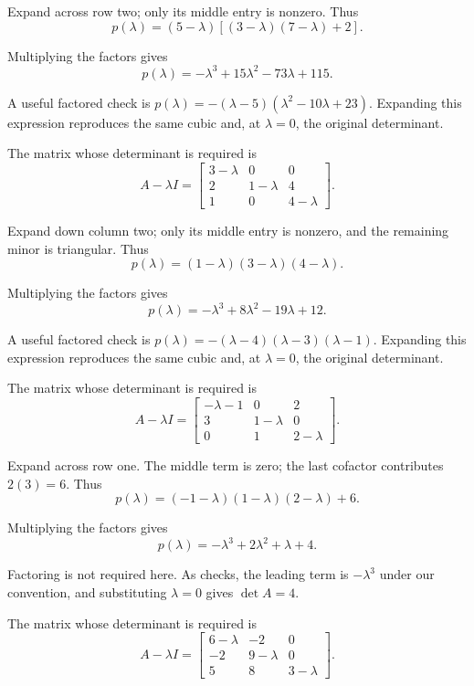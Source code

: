 Expand across row two; only its middle entry is nonzero. Thus
\[ p(\lambda)=(5-\lambda)[(3-\lambda)(7-\lambda)+2].\]

Multiplying the factors gives
\[ \boxed{p(\lambda)=- \lambda^{3} + 15 \lambda^{2} - 73 \lambda + 115}.\]

A useful factored check is $p(\lambda)=- \left(\lambda - 5\right) \left(\lambda^{2} - 10 \lambda + 23\right)$. Expanding this expression reproduces the same cubic and, at $\lambda=0$, the original determinant.

The matrix whose determinant is required is
\[ A-\lambda I=\begin{bmatrix}3 - \lambda & 0 & 0\\2 & 1 - \lambda & 4\\1 & 0 & 4 - \lambda\end{bmatrix}.\]

Expand down column two; only its middle entry is nonzero, and the remaining minor is triangular. Thus
\[ p(\lambda)=(1-\lambda)(3-\lambda)(4-\lambda).\]

Multiplying the factors gives
\[ \boxed{p(\lambda)=- \lambda^{3} + 8 \lambda^{2} - 19 \lambda + 12}.\]

A useful factored check is $p(\lambda)=- \left(\lambda - 4\right) \left(\lambda - 3\right) \left(\lambda - 1\right)$. Expanding this expression reproduces the same cubic and, at $\lambda=0$, the original determinant.

The matrix whose determinant is required is
\[ A-\lambda I=\begin{bmatrix}- \lambda - 1 & 0 & 2\\3 & 1 - \lambda & 0\\0 & 1 & 2 - \lambda\end{bmatrix}.\]

Expand across row one. The middle term is zero; the last cofactor contributes $2(3)=6$. Thus
\[ p(\lambda)=(-1-\lambda)(1-\lambda)(2-\lambda)+6.\]

Multiplying the factors gives
\[ \boxed{p(\lambda)=- \lambda^{3} + 2 \lambda^{2} + \lambda + 4}.\]

Factoring is not required here. As checks, the leading term is $-\lambda^3$ under our convention, and substituting $\lambda=0$ gives $\det A=4$.

The matrix whose determinant is required is
\[ A-\lambda I=\begin{bmatrix}6 - \lambda & -2 & 0\\-2 & 9 - \lambda & 0\\5 & 8 & 3 - \lambda\end{bmatrix}.\]

